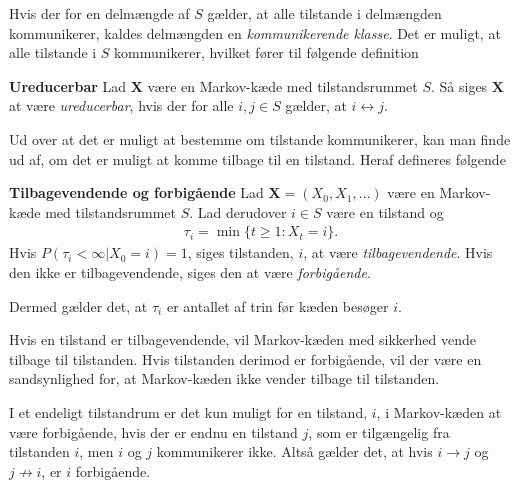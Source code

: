 Hvis der for en delmængde af $S$ gælder, at alle tilstande i delmængden kommunikerer, kaldes delmængden en \textit{kommunikerende klasse}. Det er muligt, at alle tilstande i $S$ kommunikerer, hvilket fører til følgende definition 

\begin{minipage}\textwidth
\begin{defn}\label{def:ureducerbar} \textbf{Ureducerbar} %
\newline
Lad $\bm X$ være en Markov-kæde med tilstandsrummet $S$. Så siges $\bm X$ at være \textit{ureducerbar}, hvis der for alle $i,j \in S$ gælder, at $i \leftrightarrow j$.
\end{defn}
\end{minipage}

Ud over at det er muligt at bestemme om tilstande kommunikerer, kan man finde ud af, om det er muligt at komme tilbage til en tilstand. Heraf defineres følgende

\begin{minipage}\textwidth
\begin{defn}\textbf{Tilbagevendende og forbigående} \label{def:tau}%
\newline
Lad $\bm X = (X_0, X_1, \dots)$ være en Markov-kæde med tilstandsrummet $S$. Lad derudover $i\in S$ være en tilstand og
\begin{align*}
    \tau_i=\min\{t\geq1:X_t=i\}.
\end{align*}
Hvis $P(\tau_i<\infty|X_0=i)=1$, siges tilstanden, $i$, at være \textit{tilbagevendende}. Hvis den ikke er tilbagevendende, siges den at være \textit{forbigående}.
\end{defn}
\end{minipage}

Dermed gælder det, at $\tau_i$ er antallet af trin før kæden besøger $i$.

Hvis en tilstand er tilbagevendende, vil Markov-kæden med sikkerhed vende tilbage til tilstanden. Hvis tilstanden derimod er forbigående, vil der være en sandsynlighed for, at Markov-kæden ikke vender tilbage til tilstanden. 



I et endeligt tilstandrum er det kun muligt for en tilstand, $i$, i Markov-kæden at være forbigående, hvis der er endnu en tilstand $j$, som er tilgængelig fra tilstanden $i$, men $i$ og $j$ kommunikerer ikke. Altså gælder det, at hvis $i \to j$ og $j \not\to i$, er $i$ forbigående.



